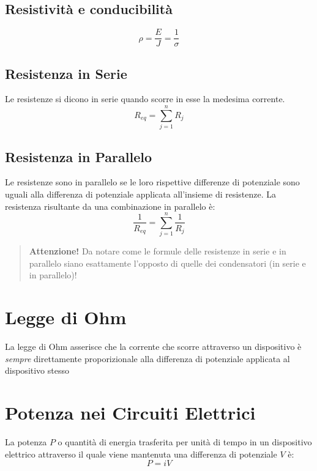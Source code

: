         \subsection{Resistività e conducibilità}
            \begin{equation}
                \rho = \frac{E}{J} = \frac{1}{\sigma}
            \end{equation}

        \subsection{Resistenza in Serie} Le resistenze si dicono in serie
        quando scorre in esse la medesima corrente.
            \begin{equation}
                R_{eq} = \sum_{j=1}^{n} R_j
            \end{equation}

        \subsection{Resistenza in Parallelo} Le resistenze sono in parallelo se
        le loro rispettive differenze di potenziale sono uguali alla differenza
        di potenziale applicata all'insieme di resistenze. La resistenza 
        risultante da una combinazione in parallelo è:
            \begin{equation}
                \frac{1}{R_{eq}} = \sum_{j = 1}^{n} \frac{1}{R_j}
            \end{equation}
        
            \begin{quote}
                \textbf{Attenzione!} Da notare come le formule delle resistenze
                in serie e in parallelo siano esattamente l'opposto di quelle
                dei condensatori (in serie e in parallelo)!
            \end{quote}


    \section{Legge di Ohm} La legge di Ohm asserisce che la corrente che scorre
    attraverso un dispositivo è \textit{sempre} direttamente proporizionale 
    alla differenza di potenziale applicata al dispositivo stesso

    \section{Potenza nei Circuiti Elettrici} La potenza $P$ o quantità di 
    energia trasferita per unità di tempo in un dispositivo elettrico 
    attraverso il quale viene mantenuta una differenza di potenziale $V$ è:
            \begin{equation}
                P = iV
            \end{equation}

